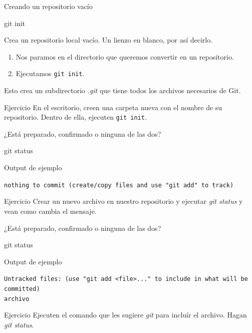 \begin{frame}[t]{Creando un repositorio vacío}
    \begin{comando}
        git init
    \end{comando}

    \pause
    \begin{block}{}
        Crea un repositorio local vacío. Un lienzo en blanco, por así decirlo.
        \begin{enumerate}
            \item Nos paramos en el directorio que queremos convertir en un repositorio.
            \item Ejecutamos \texttt{git init}.
        \end{enumerate}
        Esto crea un subdirectorio \textit{.git} que tiene todos los archivos necesarios de Git.
    \end{block}
    \pause
    \begin{ejercicio}{Ejercicio}
        En el escritorio, creen una carpeta nueva con el nombre de su repositorio. Dentro de ella, ejecuten \texttt{git init}.
    \end{ejercicio}
\end{frame}
\begin{frame}[fragile, t]{¿Está preparado, confirmado o ninguna de las dos?}
    \begin{comando}
        git status
    \end{comando}
        \begin{block}{Output de ejemplo}
            \begin{center}
            \texttt{nothing to commit (create/copy files and use "git add" to track)}
            \end{center}
        \end{block}
    \pause
    \begin{ejercicio}{Ejercicio}
        Crear un nuevo archivo en nuestro repositorio y ejecutar \textit{git status} y vean como cambia el mensaje.
    \end{ejercicio}

\end{frame}

\begin{frame}[fragile, t]{¿Está preparado, confirmado o ninguna de las dos?}
    \begin{comando}
        git status
    \end{comando}
    \begin{block}{Output de ejemplo}
            \begin{center}
            \texttt{Untracked files:
  (use "git add <file>..." to include in what will be committed) \\archivo}
            \end{center}
        \end{block}
\begin{ejercicio}{Ejercicio}
    Ejecuten el comando que les sugiere \textit{git} para incluír el archivo. Hagan \textit{git status}.
\end{ejercicio}
\end{frame}

